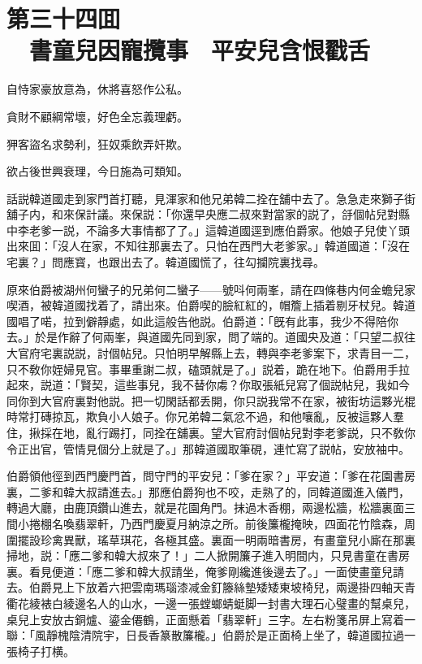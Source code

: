 
\chapter*{第三十四囬\\　書童兒因寵攬事　平安兒含恨戳舌}


\begin{myquote}
自恃家豪放意為，休將喜怒作公私。

貪財不顧綱常壞，好色全忘義理虧。

狎客盜名求勢利，狂奴乘飲弄奸欺。

欲占後世興衰理，今日施為可類知。
\end{myquote}

話説韓道國走到家門首打聽，見渾家和他兄弟韓二拴在舖中去了。急急走來獅子街舖子内，和來保計議。來保説：「你還早央應二叔來對當家的説了，㧱個帖兒對縣中李老爹一説，不論多大事情都了了。」這韓道國逕到應伯爵家。他娘子兒使丫頭出來囬：「沒人在家，不知往那裏去了。只怕在西門大老爹家。」韓道國道：「沒在宅裏？」問應寳，也跟出去了。韓道國慌了，往勾攔院裏找尋。

原來伯爵被湖州何蠻子的兄弟何二蠻子——號呌何兩峯，請在四條巷内何金蟾兒家喫酒，被韓道國找着了，請出來。伯爵喫的臉紅紅的，帽簷上插着剔牙杖兒。韓道國唱了喏，拉到僻靜處，如此這般告他説。伯爵道：「旣有此事，我少不得陪你去。」於是作辭了何兩峯，與道國先同到家，問了端的。道國央及道：「只望二叔往大官府宅裏説説，討個帖兒。只怕明早解縣上去，轉與李老爹案下，求青目一二，只不敎你姪婦見官。事畢重謝二叔，磕頭就是了。」説着，跪在地下。伯爵用手拉起來，説道：「賢契，這些事兒，我不替你䖏？你取張紙兒寫了個説帖兒，我如今同你到大官府裏對他説。把一切閑話都丢開，你只説我常不在家，被街坊這夥光棍時常打磚掠瓦，欺負小人娘子。你兄弟韓二氣忿不過，和他嚷亂，反被這夥人羣住，揪採在地，亂行踢打，同拴在舖裏。望大官府討個帖兒對李老爹説，只不敎你令正出官，管情見個分上就是了。」那韓道國取筆硯，連忙寫了説帖，安放袖中。

伯爵領他徑到西門慶門首，問守門的平安兒：「爹在家？」平安道：「爹在花園書房裏，二爹和韓大叔請進去。」那應伯爵狗也不咬，走熟了的，同韓道國進入儀門，轉過大廳，由鹿頂鑽山進去，就是花園角門。抹過木香棚，兩邊松牆，松牆裏面三間小捲棚名喚翡翠軒，乃西門慶夏月納涼之所。前後簾櫳掩映，四面花竹陰森，周圍擺設珍禽異獸，瑤草琪花，各極其盛。裏面一明兩暗書房，有畫童兒小廝在那裏掃地，説：「應二爹和韓大叔來了！」二人掀開簾子進入明間内，只見書童在書房裏。看見便道：「應二爹和韓大叔請坐，俺爹剛纔進後邊去了。」一面使畫童兒請去。伯爵見上下放着六把雲南瑪瑙漆减金釘籐絲墊矮矮東坡椅兒，兩邊掛四軸天青衢花綾裱白綾邊名人的山水，一邊一張螳螂蜻蜓脚一封書大理石心璧畫的幫桌兒，桌兒上安放古銅爐、鎏金僊鶴，正面懸着「翡翠軒」三字。左右粉箋吊屏上寫着一聯：「風靜槐陰清院宇，日長香篆散簾櫳。」伯爵於是正面椅上坐了，韓道國拉過一張椅子打横。

